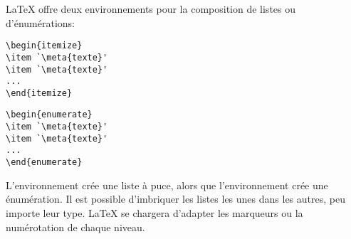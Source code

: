 {\LaTeX} offre deux environnements pour la composition de listes ou
d'énumérations:
\begin{demo}
  \begin{minipage}{0.48\linewidth}
\begin{lstlisting}
\begin{itemize}
\item `\meta{texte}'
\item `\meta{texte}'
...
\end{itemize}
\end{lstlisting}
  \end{minipage}
  \hfill
  \begin{minipage}{0.48\linewidth}
\begin{lstlisting}
\begin{enumerate}
\item `\meta{texte}'
\item `\meta{texte}'
...
\end{enumerate}
\end{lstlisting}
  \end{minipage}
\end{demo}
L'environnement  crée une liste à puce, alors que
l'environnement  crée une énumération. Il est possible
d'imbriquer les listes les unes dans les autres, peu importe leur
type. {\LaTeX} se chargera d'adapter les marqueurs ou la numérotation
de chaque niveau.

